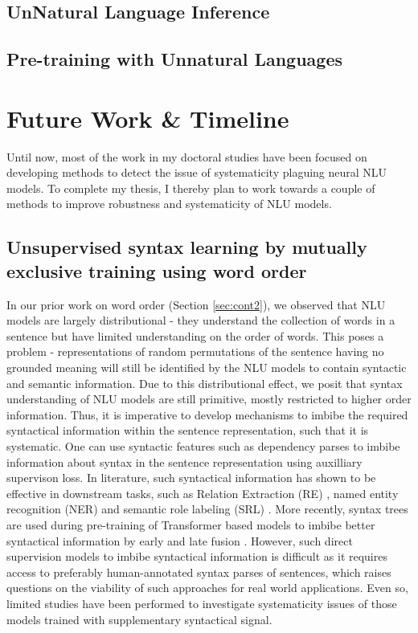 \documentclass[12pt]{article}
\begin{document}
\begin{itemize}
\subsection{UnNatural Language Inference}

\subsection{Pre-training with Unnatural Languages}

\section{Future Work \& Timeline}

Until now, most of the work in my doctoral studies have been focused on developing methods to detect the issue of systematicity plaguing neural NLU models. To complete my thesis, I thereby plan to work towards a couple of methods to improve robustness and systematicity of NLU models.

\subsection{Unsupervised syntax learning by mutually exclusive training using word order}

In our prior work on word order (Section \ref{sec:cont2}), we observed that NLU models are largely distributional - they understand the collection of words in a sentence but have limited understanding on the order of words. This poses a problem - representations of random permutations of the sentence having no grounded meaning will still be identified by the NLU models to contain syntactic and semantic information. Due to this distributional effect, we posit that syntax understanding of NLU models are still primitive, mostly restricted to higher order information. Thus, it is imperative to develop mechanisms to imbibe the required syntactical information within the sentence representation, such that it is systematic. One can use syntactic features such as dependency parses to imbibe information about syntax in the sentence representation using auxilliary supervison loss. In literature, such syntactical information has shown to be effective in downstream tasks, such as Relation Extraction (RE) \cite{fundel2007relex}, named entity recognition (NER) \cite{jie2019dependency} and semantic role labeling (SRL) \cite{strubell2018}. More recently, syntax trees are used during pre-training of Transformer based models to imbibe better syntactical information by early and late fusion \cite{sachan2021}. However, such direct supervision models to imbibe syntactical information is difficult as it requires access to preferably human-annotated syntax parses of sentences, which raises questions on the viability of such approaches for real world applications. Even so, limited studies have been performed to investigate systematicity issues of those models trained with supplementary syntactical signal.


\end{itemize}
\end{document}

